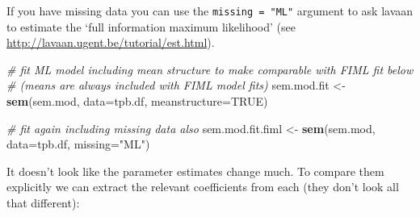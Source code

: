 \documentclass[]{article}
\newenvironment{Shaded}{\begin{snugshade}}{\end{snugshade}}
\newcommand{\KeywordTok}[1]{\textcolor[rgb]{0.13,0.29,0.53}{\textbf{#1}}}
\newcommand{\DataTypeTok}[1]{\textcolor[rgb]{0.13,0.29,0.53}{#1}}
\newcommand{\StringTok}[1]{\textcolor[rgb]{0.31,0.60,0.02}{#1}}
\newcommand{\CommentTok}[1]{\textcolor[rgb]{0.56,0.35,0.01}{\textit{#1}}}
\newcommand{\OtherTok}[1]{\textcolor[rgb]{0.56,0.35,0.01}{#1}}
\newcommand{\NormalTok}[1]{#1}
\theoremstyle{definition}
\theoremstyle{definition}
\theoremstyle{definition}
\theoremstyle{remark}
\begin{document}
If you have missing data you can use the \texttt{missing\ =\ "ML"}
argument to ask lavaan to estimate the `full information maximum
likelihood' (see \url{http://lavaan.ugent.be/tutorial/est.html}).

\begin{Shaded}
\begin{Highlighting}[]
\CommentTok{# fit ML model including mean structure to make comparable with FIML fit below}
\CommentTok{# (means are always included with FIML model fits)}
\NormalTok{sem.mod.fit <-}\StringTok{ }\KeywordTok{sem}\NormalTok{(sem.mod, }\DataTypeTok{data=}\NormalTok{tpb.df, }\DataTypeTok{meanstructure=}\OtherTok{TRUE}\NormalTok{)}

\CommentTok{# fit again including missing data also}
\NormalTok{sem.mod.fit.fiml <-}\StringTok{ }\KeywordTok{sem}\NormalTok{(sem.mod, }\DataTypeTok{data=}\NormalTok{tpb.df, }\DataTypeTok{missing=}\StringTok{"ML"}\NormalTok{)}
\end{Highlighting}
\end{Shaded}

It doesn't look like the parameter estimates change much. To compare
them explicitly we can extract the relevant coefficients from each (they
don't look all that different):
\end{document}
